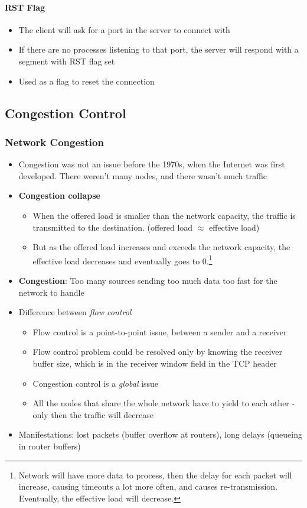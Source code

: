 \paragraph{RST Flag}
\begin{itemize}
	\item The client will ask for a port in the server to connect with
	\item If there are no processes listening to that port, the server will respond with a segment with RST flag set
	\item Used as a flag to reset the connection 
\end{itemize}


\subsection{Congestion Control}
\subsubsection{Network Congestion}
\begin{itemize}
	\item Congestion was not an issue before the 1970s, when the Internet was first developed. There weren't many nodes, and there wasn't much traffic
	\item \textbf{Congestion collapse}
	\begin{itemize}
		\item When the offered load is smaller than the network capacity, the traffic is transmitted to the destination. (offered load $\approx$ effective load)
		\item But as the offered load increases and exceeds the network capacity, the effective load decreases and eventually goes to 0.\footnote{Network will have more data to process, then the delay for each packet will increase, causing timeouts a lot more often, and causes re-transmission. Eventually, the effective load will decrease.}
	\end{itemize}
	\item \textbf{Congestion}: Too many sources sending too much data too fast for the network to handle
	\item Difference between \textit{flow control}
	\begin{itemize}
		\item Flow control is a point-to-point issue, between a sender and a receiver
		\item Flow control problem could be resolved only by knowing the receiver buffer size, which is in the receiver window field in the TCP header
		\item Congestion control is a \textit{global} issue
		\item All the nodes that share the whole network have to yield to each other - only then the traffic will decrease
	\end{itemize}
	\item Manifestations: lost packets (buffer overflow at routers), long delays (queueing in router buffers)
\end{itemize}

